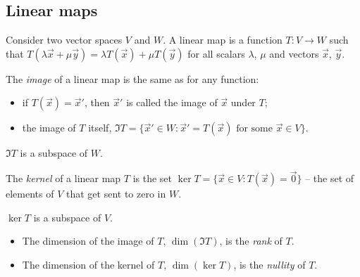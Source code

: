 \documentclass{../template/note}
\begin{document}
    \subsection{Linear maps}

    \begin{definition} 
        Consider two vector spaces \(V\) and \(W\). A linear map is a function \(T: V \to W\) such that \(T(\lambda \vec x + \mu \vec y) = \lambda T(\vec x) + \mu T(\vec y)\) for all scalars \(\lambda\), \(\mu\) and vectors \(\vec x\), \(\vec y\).
    \end{definition}
    
    \begin{definition}
        The \emph{image} of a linear map is the same as for any function:
        \begin{itemize}
            \item if \(T(\vec x) = \vec x'\), then \(\vec x'\) is called the image of \(\vec x\) under \(T\);
            \item the image of \(T\) itself, \(\Im T = \{\vec x' \in W : \vec x' = T(\vec x) \text{ for some } \vec x \in V\}\).
        \end{itemize}
    \end{definition}
    
    \begin{proposition}
        \(\Im T\) is a subspace of \(W\).
    \end{proposition}
    
    \begin{definition}
        The \emph{kernel} of a linear map \(T\) is the set \(\ker T = \{\vec x \in V: T(\vec x) = \vec 0\}\) -- the set of elements of \(V\) that get sent to zero in \(W\).
    \end{definition}
    
    \begin{proposition}
        \(\ker T\) is a subspace of \(V\).
    \end{proposition}
    
    \begin{definition}
        \begin{itemize}
            \item The dimension of the image of \(T\), \(\dim(\Im T)\), is the \emph{rank} of \(T\).
            \item The dimension of the kernel of \(T\), \(\dim(\ker T)\), is the \emph{nullity} of \(T\).
        \end{itemize}
    \end{definition}
    
\end{document}
